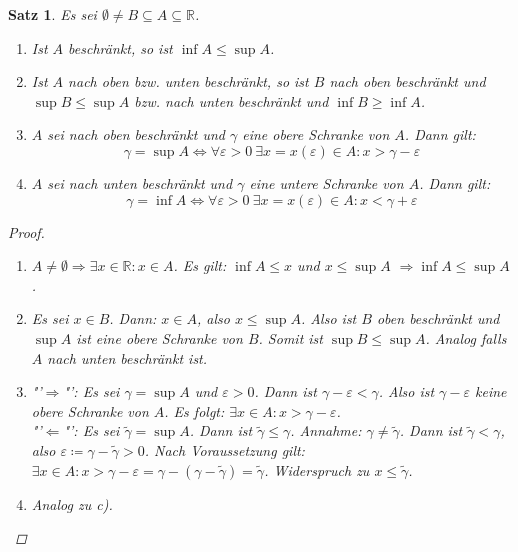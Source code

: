 \documentclass[12pt]{extreport} %
\newcommand{\R}{\mathbb{R}}
\theoremstyle{named}
\theoremstyle{itshape}
\newtheorem{satz}[unnamedtheorem]{Satz}
\theoremstyle{normal}
\begin{document}
\begin{satz} \label{1.2:satz}
	Es sei $\emptyset \neq B \subseteq A \subseteq \R$.
	\begin{enumerate}
		\item Ist $A$ beschränkt, so ist $\inf A \leq \sup A$.
		\item Ist $A$ nach oben bzw. unten beschränkt, so ist $B$ nach oben beschränkt und $\sup B \leq \sup A$ bzw. nach unten beschränkt und $\inf B \geq \inf A$.
		\item $A$ sei nach oben beschränkt und $\gamma$ eine obere Schranke von $A$. Dann gilt:
			$$
				\gamma = \sup A \iff \forall \varepsilon > 0 ~\exists x = x(\varepsilon) \in A : x > \gamma - \varepsilon
			$$
		\item $A$ sei nach unten beschränkt und $\gamma$ eine untere Schranke von $A$. Dann gilt:
			$$
				\gamma = \inf A \iff \forall \varepsilon > 0 ~\exists x = x(\varepsilon) \in A : x < \gamma + \varepsilon
			$$	
	\end{enumerate}

	\begin{proof} ~\ 
		\begin{enumerate}
			\item $A \neq \emptyset \Rightarrow \exists x \in \R : x \in A$. Es gilt: $\inf A \leq x$ und $x \leq \sup A$ $ \Rightarrow \inf A \leq \sup A $.
			\item Es sei $x \in B$. Dann: $x \in A$, also $x \leq \sup A$. Also ist $B$ oben beschränkt und $\sup A$ ist eine obere Schranke von $B$. Somit ist
			      $\sup B \leq \sup A $. Analog falls $A$ nach unten beschränkt ist.
			\item "'$\Rightarrow$"': Es sei $\gamma = \sup A$ und $\varepsilon > 0$. Dann ist $\gamma - \varepsilon < \gamma$. Also ist $\gamma - \varepsilon$ keine obere 
			        Schranke von $A$. Es folgt: $\exists x \in A : x > \gamma - \varepsilon$. \\
				"'$\Leftarrow$"': Es sei $\tilde{\gamma} = \sup A$. Dann ist $\tilde{\gamma} \leq \gamma$. Annahme: $\gamma \neq \tilde{\gamma}$. Dann ist 
				$\tilde{\gamma} < \gamma$, also	$\varepsilon \coloneqq \gamma - \tilde{\gamma} > 0$. Nach Voraussetzung gilt: 
				$\exists x \in A: x > \gamma - \varepsilon = \gamma- (\gamma - \tilde{\gamma}) = \tilde{\gamma}$. Widerspruch zu $x \leq \tilde{\gamma}$.
			\item Analog zu c).
		\end{enumerate}
	\end{proof}
\end{satz}
\end{document}
